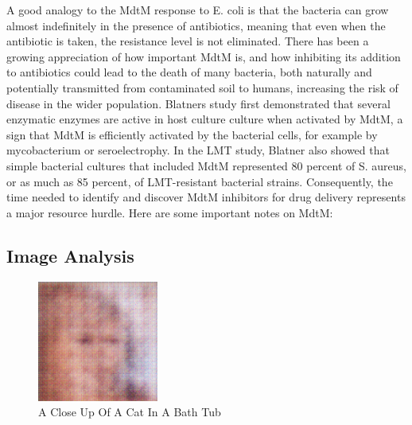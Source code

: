 \documentclass{article}%
\begin{document}
A good analogy to the MdtM response to E. coli is that the bacteria can grow almost indefinitely in the presence of antibiotics, meaning that even when the antibiotic is taken, the resistance level is not eliminated. There has been a growing appreciation of how important MdtM is, and how inhibiting its addition to antibiotics could lead to the death of many bacteria, both naturally and potentially transmitted from contaminated soil to humans, increasing the risk of disease in the wider population.\newline%
Blatners study first demonstrated that several enzymatic enzymes are active in host culture culture when activated by MdtM, a sign that MdtM is efficiently activated by the bacterial cells, for example by mycobacterium or seroelectrophy. In the LMT study, Blatner also showed that simple bacterial cultures that included MdtM represented 80 percent of S. aureus, or as much as 85 percent, of LMT{-}resistant bacterial strains. Consequently, the time needed to identify and discover MdtM inhibitors for drug delivery represents a major resource hurdle.\newline%
Here are some important notes on MdtM:

%
\subsection{Image Analysis}%
\label{subsec:ImageAnalysis}%


\begin{figure}[h!]%
\centering%
\includegraphics[width=150px]{500_fake_images/samples_5_405.png}%
\caption{A Close Up Of A Cat In A Bath Tub}%
\end{figure}

%
\end{document}
